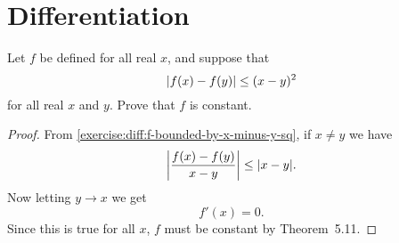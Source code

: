 \chapter{Differentiation}

 Let $f$ be defined for all real $x$, and suppose that
\begin{equation}
  \label{exercise:diff:f-bounded-by-x-minus-y-sq}
  \lvert{f(x) - f(y)}\rvert \leq (x - y)^2
\end{equation}
for all real $x$ and $y$. Prove that $f$ is constant.
\begin{proof}
  From \eqref{exercise:diff:f-bounded-by-x-minus-y-sq}, if $x\neq y$
  we have
  \begin{equation*}
    \left\lvert{\frac{f(x) - f(y)}{x-y}}\right\rvert \leq \lvert{x - y}\rvert.
  \end{equation*}
  Now letting $y\to x$ we get
  \begin{equation*}
    f'(x) = 0.
  \end{equation*}
  Since this is true for all $x$, $f$ must be constant by
  Theorem~5.11.
\end{proof}

